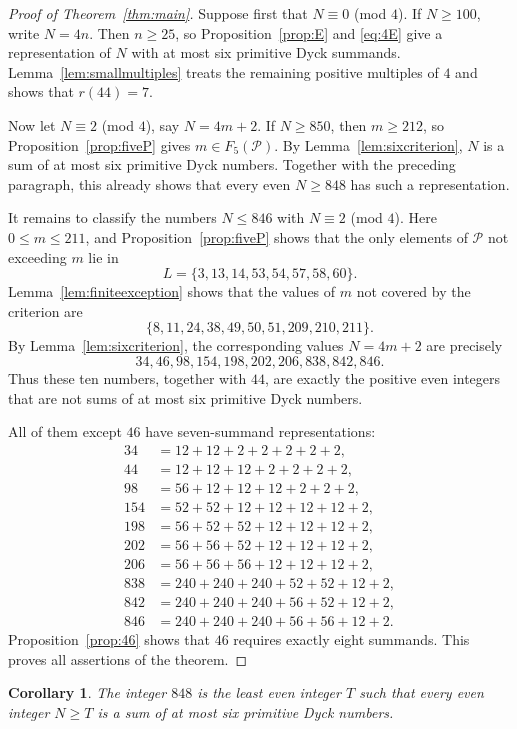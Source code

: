 \documentclass[12pt]{article}
\theoremstyle{plain}
\newtheorem{corollary}[theorem]{Corollary}
\newcommand{\Pset}{\mathcal P}
\begin{document}
\begin{proof}[Proof of Theorem~\ref{thm:main}]
Suppose first that $N\equiv0$ (mod $4$).  If $N\geq100$, write $N=4n$.
Then $n\geq25$, so Proposition~\ref{prop:E} and \eqref{eq:4E} give a
representation of $N$ with at most six primitive Dyck summands.
Lemma~\ref{lem:smallmultiples} treats the remaining positive multiples
of $4$ and shows that $r(44)=7$.

Now let $N\equiv2$ (mod $4$), say $N=4m+2$.  If $N\geq850$, then $m\geq212$,
so Proposition~\ref{prop:fiveP} gives $m\in F_5(\Pset)$.  By
Lemma~\ref{lem:sixcriterion}, $N$ is a sum of at most six primitive
Dyck numbers.  Together with the preceding paragraph, this already
shows that every even $N\geq848$ has such a representation.

It remains to classify the numbers $N\leq846$ with $N\equiv2$ (mod $4$).
Here $0\leq m\leq211$, and Proposition~\ref{prop:fiveP} shows that the
only elements of $\Pset$ not exceeding $m$ lie in
\[
 L=\{3,13,14,53,54,57,58,60\}.
\]
Lemma~\ref{lem:finiteexception} shows that the values of $m$ not
covered by the criterion are
\[
 \{8,11,24,38,49,50,51,209,210,211\}.
\]
By Lemma~\ref{lem:sixcriterion}, the corresponding values $N=4m+2$
are precisely
\[
 34,46,98,154,198,202,206,838,842,846.
\]
Thus these ten numbers, together with $44$, are exactly the positive
even integers that are not sums of at most six primitive Dyck numbers.

All of them except $46$ have seven-summand representations:
\[
\begin{aligned}
34&=12+12+2+2+2+2+2,\\
44&=12+12+12+2+2+2+2,\\
98&=56+12+12+12+2+2+2,\\
154&=52+52+12+12+12+12+2,\\
198&=56+52+52+12+12+12+2,\\
202&=56+56+52+12+12+12+2,\\
206&=56+56+56+12+12+12+2,\\
838&=240+240+240+52+52+12+2,\\
842&=240+240+240+56+52+12+2,\\
846&=240+240+240+56+56+12+2.
\end{aligned}
\]
Proposition~\ref{prop:46} shows that $46$ requires exactly eight
summands.  This proves all assertions of the theorem.
\end{proof}

\begin{corollary}\label{cor:threshold}
The integer $848$ is the least even integer $T$ such that every even
integer $N\geq T$ is a sum of at most six primitive Dyck numbers.
\end{corollary}
\end{document}
